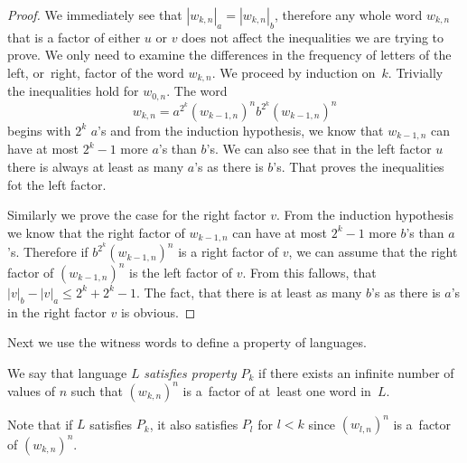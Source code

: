 \begin{proof}
    We immediately see that $|w_{k,n}|_a = |w_{k,n}|_b$, therefore any whole word $w_{k,n}$ that is a factor of either $u$ or $v$ does not affect the inequalities we are trying to prove. We only need to examine the differences in the frequency of letters of the left, or~right, factor of the word $w_{k,n}$. We proceed by induction on~$k$. Trivially the inequalities hold for $w_{0,n}$. The word
    \[
        w_{k,n} = a^{2^k}{(w_{k-1,n})}^{n}b^{2^k}{(w_{k-1,n})}^{n}
    \] begins with $2^k$ $a$'s and from the induction hypothesis, we know that $w_{k-1,n}$ can have at most $2^k-1$ more $a$'s than $b$'s. We can also see that in the left factor $u$ there is always at least as many $a$'s as there is $b$'s. That proves the inequalities fot the left factor.

    Similarly we prove the case for the right factor $v$. From the induction hypothesis we know that the right factor of $w_{k-1,n}$ can have at most $2^k-1$ more $b$'s than $a$'s. Therefore if $b^{2^k}{(w_{k-1,n})}^{n}$ is a right factor of $v$, we can assume that the right factor of ${(w_{k-1,n})}^{n}$ is the left factor of $v$. From this fallows, that $|v|_b - |v|_a \leq 2^k + 2^k -1$. The fact, that there is at least as many $b$'s as there is $a$'s in the right factor $v$ is obvious.
\end{proof}

Next we use the witness words to define a property of languages.

\begin{defn}
    We say that language $L$ \emph{satisfies property $P_k$} if there exists an infinite number of values of $n$ such that ${(w_{k,n})}^n$ is a~factor of at~least one word in~$L$.
\end{defn}

Note that if $L$ satisfies $P_k$, it also satisfies $P_l$ for $l < k$ since ${(w_{l,n})}^n$ is a~factor of ${(w_{k,n})}^n$.

